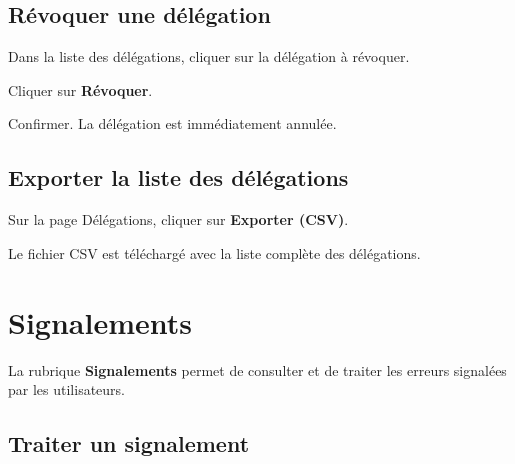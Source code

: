 
\subsection{R\'evoquer une d\'el\'egation}

\begin{steps}
  \item Dans la liste des d\'el\'egations, cliquer sur la d\'el\'egation \`a r\'evoquer.
  \item Cliquer sur \textbf{R\'evoquer}.
  \item Confirmer. La d\'el\'egation est imm\'ediatement annul\'ee.
\end{steps}

\subsection{Exporter la liste des d\'el\'egations}

\begin{steps}
  \item Sur la page D\'el\'egations, cliquer sur \textbf{Exporter (CSV)}.
  \item Le fichier CSV est t\'el\'echarg\'e avec la liste compl\`ete des d\'el\'egations.
\end{steps}

\section{Signalements}

La rubrique \textbf{Signalements} permet de consulter et de traiter les erreurs signal\'ees par les utilisateurs.


\subsection{Traiter un signalement}

